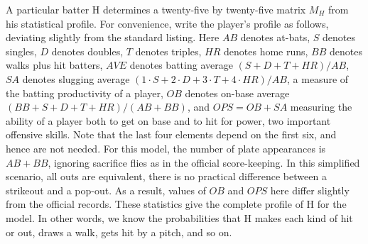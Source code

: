 \documentclass[12pt]{article}
\begin{document}
A particular batter H determines a twenty-five by twenty-five matrix
\( M_{H} \) from his statistical profile.  For convenience, write the
player's profile as follows, deviating slightly from the standard
listing.  Here \( \mathit{AB} \) denotes at-bats, \( S \) denotes
singles, \( D \) denotes doubles, \( T \) denotes triples,
\( \mathit{HR} \) denotes home runs, \( \mathit{BB} \) denotes walks
plus hit batters, \( \mathit{AVE} \) denotes batting average
\( (S + D + T + \mathit{HR})/\mathit{AB} \), \( \mathit{SA} \) denotes
slugging average
\( (1 \cdot S + 2 \cdot D + 3 \cdot T + 4 \cdot
\mathit{HR})/\mathit{AB} \), a measure of the batting productivity of
a player, \( \mathit{OB} \) denotes on-base average
\( (\mathit{BB} + S + D + T + \mathit{HR})/(\mathit{AB}+\mathit{BB})
\), and \( \mathit{OPS} = \mathit{OB} + \mathit{SA} \) measuring the
ability of a player both to get on base and to hit for power, two
important offensive skills.  Note that the last four elements depend
on the first six, and hence are not needed.  For this model, the
number of plate appearances is \( \mathit{AB} + \mathit{BB} \),
ignoring sacrifice flies as in the official score-keeping.  In this
simplified scenario, all outs are equivalent, there is no practical
difference between a strikeout and a pop-out.  As a result, values of
\( \mathit{OB} \) and \( \mathit{OPS} \) here differ slightly from the
official records.  These statistics give the complete profile of H for
the model.  In other words, we know the probabilities that H makes
each kind of hit or out, draws a walk, gets hit by a pitch, and so on.
\end{document}
